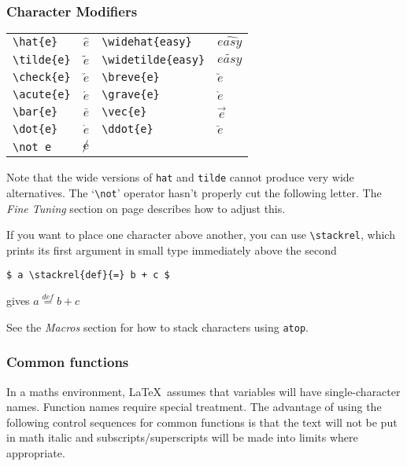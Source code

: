 \documentclass[dvips]{article}
\begin{document}
\subsubsection{Character Modifiers}
\begin{longtable}{llll}
\verb|\hat{e}|&            $\hat{e}$&            
\verb|\widehat{easy}|&      $\widehat{easy}$ \\     
\verb|\tilde{e}|&          $\tilde{e}$&          
\verb|\widetilde{easy}|&   $\widetilde{easy}$\\   
\verb|\check{e}|&          $\check{e}$&          
\verb|\breve{e}|&          $\breve{e}$\\         
\verb|\acute{e}|&          $\acute{e}$&          
\verb|\grave{e}|&          $\grave{e}$\\          
\verb|\bar{e}|&            $\bar{e}$&            
\verb|\vec{e}|&            $\vec{e}$\\            
\verb|\dot{e}|&            $\dot{e}$&            
\verb|\ddot{e}|&           $\ddot{e}$\\           
\verb|\not e| &            $\not e$ & & \\
\end{longtable}

\vspace{.5cm}
Note that the wide versions of \texttt{hat} and \texttt{tilde} cannot produce
very wide alternatives. The `\verb|\not|' operator hasn't properly 
cut the following letter. The \emph{Fine Tuning} section on page 
\pageref{FINE_TUNING}
describes how to adjust this.

 If you want to place one character 
above another, you can use \verb|\stackrel|, which prints 
its first argument in small type immediately above the second
\begin{verbatim}
$ a \stackrel{def}{=} b + c $
\end{verbatim}
gives
$ a \stackrel{def}{=} b + c $

See the \emph{Macros} section for how to stack characters using \texttt{atop}.

\subsubsection{Common functions}
In a maths environment, \LaTeX\ assumes that variables will 
have single-character names. Function names require 
special treatment.
The advantage of using the following control sequences for
common functions is that the text will not
be put in math italic and subscripts/superscripts will be made into limits
where appropriate.
\end{document}
